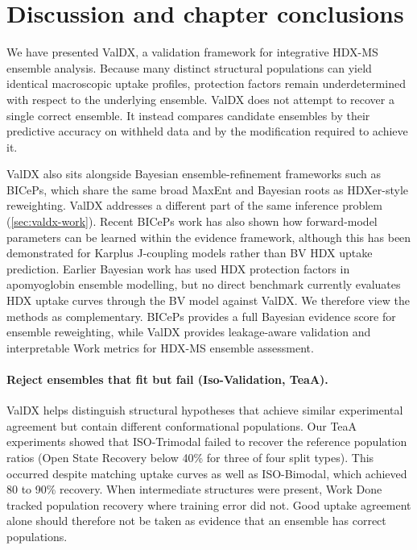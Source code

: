 \section{Discussion and chapter conclusions}
\label{sec:valdx-discussion}

We have presented ValDX, a validation framework for integrative HDX-MS ensemble analysis. Because many distinct structural populations can yield identical macroscopic uptake profiles, protection factors remain underdetermined with respect to the underlying ensemble. ValDX does not attempt to recover a single correct ensemble. It instead compares candidate ensembles by their predictive accuracy on withheld data and by the modification required to achieve it.

ValDX also sits alongside Bayesian ensemble-refinement frameworks such as BICePs, which share the same broad MaxEnt and Bayesian roots as HDXer-style reweighting.\supercite{hummerBayesianEnsembleRefinement2015,kofingerEfficientEnsembleRefinement2019,cesariUsingMaximumEntropy2018,crehuetBayesianMaximumEntropyReweightingIDP2019,raddiBICePsV20Software2023c} ValDX addresses a different part of the same inference problem (\cref{sec:valdx-work}). Recent BICePs work has also shown how forward-model parameters can be learned within the evidence framework, although this has been demonstrated for Karplus J-coupling models rather than BV HDX uptake prediction.\supercite{raddiAutomaticForwardModel2025} Earlier Bayesian work has used HDX protection factors in apomyoglobin ensemble modelling,\supercite{wanReconcilingSimulatedEnsembles2020} but no direct benchmark currently evaluates HDX uptake curves through the BV model against ValDX. We therefore view the methods as complementary. BICePs provides a full Bayesian evidence score for ensemble reweighting, while ValDX provides leakage-aware validation and interpretable Work metrics for HDX-MS ensemble assessment.

\paragraph{Reject ensembles that fit but fail (Iso-Validation, TeaA).}
ValDX helps distinguish structural hypotheses that achieve similar experimental agreement but contain different conformational populations. Our TeaA experiments showed that ISO-Trimodal failed to recover the reference population ratios (Open State Recovery below 40\% for three of four split types). This occurred despite matching uptake curves as well as ISO-Bimodal, which achieved 80 to 90\% recovery. When intermediate structures were present, Work Done tracked population recovery where training error did not. Good uptake agreement alone should therefore not be taken as evidence that an ensemble has correct populations.

